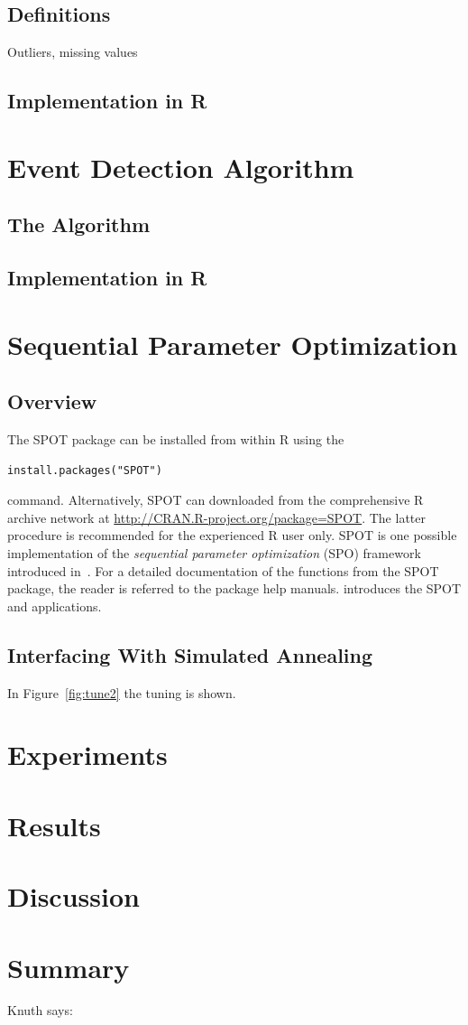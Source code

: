 \documentclass[runningheads]{llncs}
\begin{document}
\subsection{Definitions}
Outliers, missing values
\subsection{Implementation in R}

\section{Event Detection Algorithm}\label{sec:EDA}
\subsection{The Algorithm}

\subsection{Implementation in R}

\section{Sequential Parameter Optimization}
\subsection{Overview}
 The SPOT package can be installed from within R using the 
\begin{verbatim}
install.packages("SPOT")
\end{verbatim}
command. Alternatively, SPOT can 
downloaded from the
comprehensive R  archive network at \url{http://CRAN.R-project.org/package=SPOT}.
The latter procedure is recommended for the experienced R user only. 
SPOT is one possible implementation of the \emph{sequential parameter optimization}\/
(SPO) framework introduced in~\cite{Bart06a}.
For a detailed documentation of the functions from the SPOT package, the
reader is referred to the package help manuals.
\cite{Bart12i} introduces the SPOT and applications.
\subsection{Interfacing With Simulated Annealing}
In Figure~\ref{fig:tune2} the tuning is shown.




\section{Experiments}

\section{Results}

\section{Discussion}

\section{Summary}
Knuth says:
\cite{knuth2005art}



\end{document}
